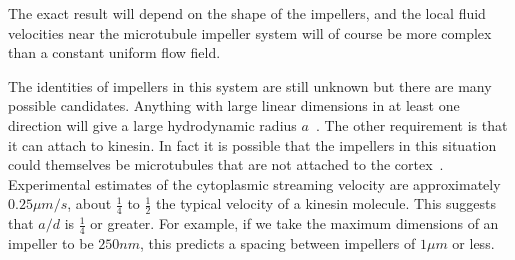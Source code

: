 \documentclass[11pt]{ucthesis}
\begin{document}
The exact result will depend on the shape of the impellers, and the local fluid velocities near the microtubule impeller system will of course be more complex than a constant uniform flow field.




The identities of impellers in this system are still unknown but there are many possible
candidates. Anything with  large linear dimensions in at least one direction 
will give a large hydrodynamic radius $a$~\cite{BergRandomWalksinBiology}. The
other requirement is that it can attach to kinesin.  In fact
it is possible that the impellers in this situation could themselves be microtubules that are
not attached to the cortex~\cite{WangRiechmann,Seeger}.
Experimental estimates of the cytoplasmic streaming velocity
are approximately $0.25 \mu m/s$, about $\frac{1}{4}$ to $\frac{1}{2}$ the typical velocity of a kinesin
molecule. This suggests that $a/d$ is $\frac{1}{4}$ or greater.
For example, if we take the maximum dimensions of an impeller to be $250 nm$,
this predicts a spacing between impellers of $1 \mu m$ or less.
\end{document}

